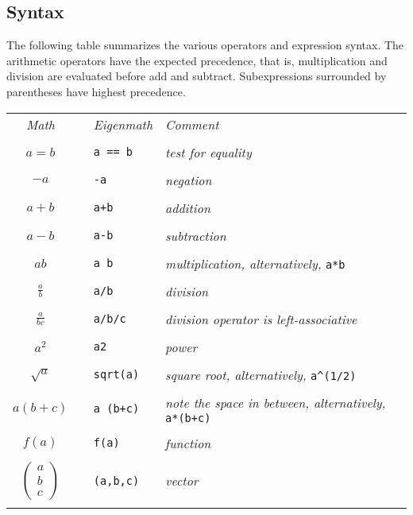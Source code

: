 \subsection{Syntax}
The following table summarizes the various operators and expression syntax.
The arithmetic operators have the expected precedence, that is,
multiplication and division are evaluated before add and subtract.
Subexpressions surrounded by parentheses have highest precedence.

\begin{center}
\begin{tabular}{clll}
{\it Math} & & {\it Eigenmath} & {\it Comment} \\
\\
$a=b$ & & \verb$a == b$ & {\it test for equality} \\
\\
$-a$ & & {\tt -a} & {\it negation} \\
\\
$a+b$ & & {\tt a+b} & {\it addition} \\
\\
$a-b$ & & {\tt a-b} & {\it subtraction} \\
\\
$ab$ & & {\tt a b} & {\it multiplication, alternatively,} \verb$a*b$ \\
\\
$\displaystyle\frac{a}{b}$ & & {\tt a/b} & {\it division}\\
\\
$\displaystyle\frac{a}{bc}$ & & {\tt a/b/c} & {\it division operator is left-associative} \\
\\
$a^2$ & & {\tt a{\char94}2} & {\it power}\\
\\
$\sqrt{a}$ & & \verb$sqrt(a)$ & {\it square root, alternatively,} \verb$a^(1/2)$ \\
\\
$a(b+c)$ & & {\tt a (b+c)} & {\it note the space in between, alternatively,} \verb$a*(b+c)$ \\
\\
$f(a)$ & & {\tt f(a)} & {\it function} \\
\\
$\begin{pmatrix}a\\ b\\ c\end{pmatrix}$ & & {\tt (a,b,c)} & {\it vector} \\
\\

\end{tabular}
\end{center}
